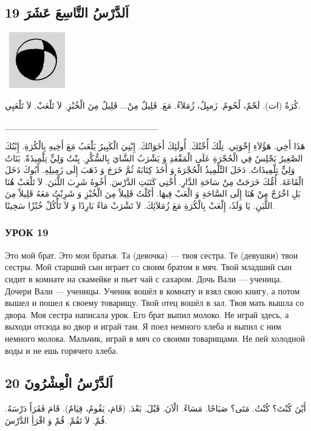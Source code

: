 \documentclass[a5paper]{article}
\begin{document}
\subsection{19 اَلدَّرْسُ التَّاسِعَ عَشَرَ}
\  \includegraphics[width=0.9583in,height=0.9583in]{MuhammadBagauddinlatinized-img034.jpg} 

كُرَةٌ (ات). لَحْمٌ، لُحُومٌ. زَميِلٌ، زُمَلاَءُ. مَعَ. قَلِيلٌ مِنْ... قَلِيلٌ مِنَ الْخُبْزِ. لاَ تَلْعَبْ. لاَ تَلْعَبِي.

\_\_\_\_\_\_\_\_\_\_\_\_\_\_\_\_\_\_\_\_\_\_\_\_

هَذَا أَخِي. هَؤُلاَءِ إِخْوَتِي. تِلْكَ أُخْتُكَ. أُولَئِكَ أَخَوَاتُكَ. إِبْنِيَ الْكَبِيرُ يَلْعَبُ مَعَ أَخِيهِ بِالْكُرَةِ. إِبْنُكَ الصَّغِيرُ يَجْلِسُ فِي الْحُجْرَةِ عَلَى الْمَقْعَدِ وَ يَشْرَبُ الشَّايَ بِالسُّكَّرِ. بِنْتُ وَلِيٍّ تِلْمِيذَةٌ. بَنَاتُ وَلِيٍّ تِلْمِيذَاتٌ. دَخَلَ التِّلْمِيذُ الْحُجْرَةَ وَ أَخَذَ كِتَابَهُ ثُمَّ خَرَجَ وَ ذَهَبَ إِلَى زَمِيلِهِ. أَبُوكَ دَخَلَ الْقَاعَةَ. أُمُّكَ خَرَجَتْ مِنْ سَاحَةِ الدَّارِ. أُخْتِي كَتَبَتِ الدَّرْسَ. أَخُوهُ شَرِبَ اللَّبَنَ. لاَ تَلْعَبْ هُنَا بَلِ اخْرُجْ مِنْ هُنَا إِلَى السَّاحَةِ وَ الْعَبْ فِيهَا. أَكَلْتُ قَلِيلاً مِنَ الْخُبْزِ وَ شَرِبْتُ مَعَهُ قَلِيلاً مِنَ اللَّبَنِ. يَا وَلَدُ، إِلْعَبْ بِالْكُرَةِ مَعَ زُمَلاَئِكَ. لاَ تَشْرَبْ مَاءً بَارِدًا وَ لاَ تَأْكُلْ خُبْزًا سَخِينًا.

\subsubsection{УРОК 19}
Это мой брат. Это мои братья. Та (девочка) — твоя сестра. Те (девушки) твои сестры. Мой старший сын играет со своим братом в мяч. Твой младший сын сидит в комнате на скамейке и пьет чай с сахаром. Дочь Вали — ученица. Дочери Вали — ученицы. Ученик вошёл в комнату и взял свою книгу, а потом вышел и пошел к своему товарищу. Твой отец вошёл в зал. Твоя мать вышла со двора. Моя сестра написала урок. Его брат выпил молоко. Не играй здесь, а выходи отсюда во двор и играй там. Я поел немного хлеба и выпил с ним немного молока. Мальчик, играй в мяч со своими товарищами. Не пей холодной воды и не ешь горячего хлеба.

\subsection{20 اَلدَّرْسُ الْعِشْرُونَ}
أَيْنَ كُنْتَ؟ كُنْتُ. مَتَى؟ صَبَاحًا. مَسَاءً. الْآنَ. قَبْلَ. بَعْدَ. (قَامَ، يَقُومُ، قِيَامٌ). قَامَ فَقَرَأَ دَرْسَهُ. قُمْ. لاَ تَقُمْ. قُمْ وَ اقْرَأِ الدَّرْسَ.
\end{document}
